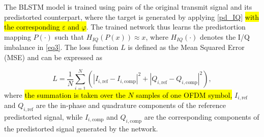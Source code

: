 \documentclass[lettersize,journal]{IEEEtran}
\begin{document}






The BLSTM model is trained using pairs of the original transmit signal and its predistorted counterpart, where the target is generated by applying \eqref{pd_IQ} \hl{with the corresponding $\varepsilon$ and $\varphi$}.
The trained network thus learns the predistortion mapping $P(\cdot)$ such that $H_{IQ}(P(x)) \approx x$, where $H_{IQ}(\cdot)$ denotes the I/Q imbalance in \eqref{eq3}.
The loss function $L$ is defined as the Mean Squared Error (MSE) and can be expressed as

\begin{equation}
\label{eq_loss_func}
L = \frac{1}{N} \sum_{i=1}^{N}(|I_{i,\mathrm{ref}}-I_{i,\mathrm{comp}}|^2+|Q_{i,\mathrm{ref}}-Q_{i,\mathrm{comp}}|^2),
\end{equation}
where \hl{the summation is taken over the $N$ samples of one OFDM symbol,} $I_{i,\mathrm{ref}}$ and $Q_{i,\mathrm{ref}}$ are the in-phase and quadrature components of the reference predistorted signal, while $I_{i,\mathrm{comp}}$ and $Q_{i,\mathrm{comp}}$ are the corresponding components of the predistorted signal generated by the network.
\end{document}
